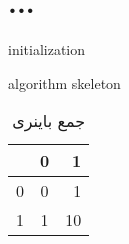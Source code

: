 \chapter{...}
\begin{LTR}
	\begin{algorithm}[H]
		initialization\;
		\caption{algorithm skeleton}
	\end{algorithm}
	\begin{center}
		\begin{table}[]
			\centering
			\begin{tabular}{ l | c | r }		
				& 0 & 1 \\
				\hline	
				0 & 0 & 1 \\
				1 & 1 & 10 \\
				\hline  
			\end{tabular}
			\caption{جمع باینری}
		\end{table}
	\end{center}
\end{LTR}
